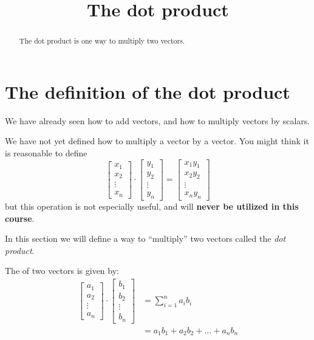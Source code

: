 \documentclass{ximera}
\title[Dig-In:]{The dot product}
\begin{document}
\begin{abstract}
  The dot product is one way to multiply two vectors.
\end{abstract}
\maketitle


\section{The definition of the dot product}

We have already seen how to add vectors, and how to multiply vectors
by scalars.

\begin{warning}
We have not yet defined how to multiply a vector by a vector.  You
might think it is reasonable to define
\[
\begin{bmatrix}x_1\\x_2\\\vdots\\x_n\end{bmatrix} \cdot  \begin{bmatrix}y_1\\y_2\\\vdots\\y_n\end{bmatrix}=\begin{bmatrix}x_1y_1\\x_2y_2\\\vdots\\x_ny_n\end{bmatrix}
\] 
but this operation is not especially useful, and will \textbf{never be
  utilized in this course}.
\end{warning}

In this section we will define a way to ``multiply'' two vectors
called the \textit{dot product}.

\begin{definition}
  The  of two vectors is given by:
  \begin{align*}
  \begin{bmatrix}
    a_1\\
    a_2\\
    \vdots\\
    a_n
  \end{bmatrix}
  \cdot
  \begin{bmatrix}
    b_1\\
    b_2\\
    \vdots\\
    b_n
  \end{bmatrix}
  &= \sum_{i=1}^n a_ib_i\\
  &= a_1b_1 + a_2b_2 +\dots+a_nb_n
  \end{align*}
\end{definition}
\end{document}
